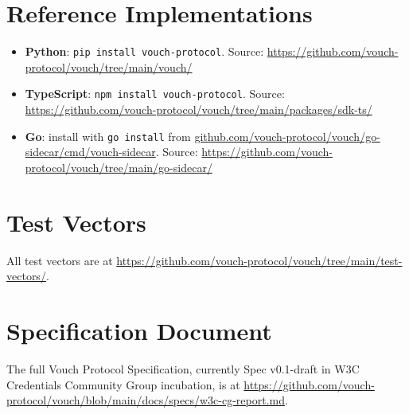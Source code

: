 \documentclass[11pt,a4paper,twocolumn]{article}
\begin{document}



\appendix

\section{Reference Implementations}

\begin{itemize}[leftmargin=*]
\item \textbf{Python}: \verb|pip install vouch-protocol|. Source: \url{https://github.com/vouch-protocol/vouch/tree/main/vouch/}
\item \textbf{TypeScript}: \verb|npm install vouch-protocol|. Source: \url{https://github.com/vouch-protocol/vouch/tree/main/packages/sdk-ts/}
\item \textbf{Go}: install with \verb|go install| from \url{github.com/vouch-protocol/vouch/go-sidecar/cmd/vouch-sidecar}. Source: \url{https://github.com/vouch-protocol/vouch/tree/main/go-sidecar/}
\end{itemize}

\section{Test Vectors}

All test vectors are at \url{https://github.com/vouch-protocol/vouch/tree/main/test-vectors/}.

\section{Specification Document}

The full Vouch Protocol Specification, currently Spec v0.1-draft in W3C Credentials Community Group incubation, is at \url{https://github.com/vouch-protocol/vouch/blob/main/docs/specs/w3c-cg-report.md}.
\end{document}

